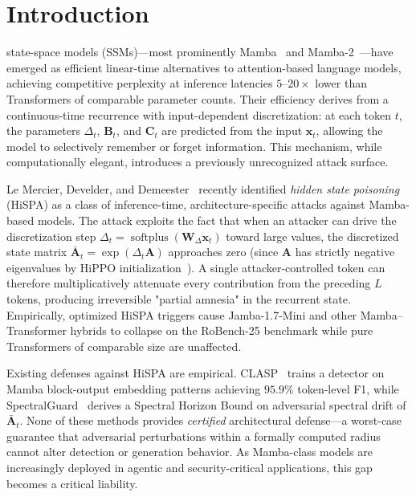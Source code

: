 \documentclass[journal,a4paper,10pt]{IEEEtran}
\theoremstyle{definition}
\theoremstyle{remark}
\DeclareMathOperator{\softplus}{softplus}
\begin{document}
\section{Introduction}
\label{sec:introduction}

 state-space models (SSMs)---most prominently Mamba~\cite{gu2024mamba} and Mamba-2~\cite{dao2024mamba2}---have emerged as efficient linear-time alternatives to attention-based language models, achieving competitive perplexity at inference latencies $5$--$20\times$ lower than Transformers of comparable parameter counts. Their efficiency derives from a continuous-time recurrence with input-dependent discretization: at each token $t$, the parameters $\Delta_t$, $\mathbf{B}_t$, and $\mathbf{C}_t$ are predicted from the input $\mathbf{x}_t$, allowing the model to selectively remember or forget information. This mechanism, while computationally elegant, introduces a previously unrecognized attack surface.

Le Mercier, Develder, and Demeester~\cite{lemercier2026hispa} recently identified \emph{hidden state poisoning} (HiSPA) as a class of inference-time, architecture-specific attacks against Mamba-based models. The attack exploits the fact that when an attacker can drive the discretization step $\Delta_t = \softplus(\mathbf{W}_\Delta \mathbf{x}_t)$ toward large values, the discretized state matrix $\bar{\mathbf{A}}_t = \exp(\Delta_t \mathbf{A})$ approaches zero (since $\mathbf{A}$ has strictly negative eigenvalues by HiPPO initialization~\cite{gu2020hippo}). A single attacker-controlled token can therefore multiplicatively attenuate every contribution from the preceding $L$ tokens, producing irreversible "partial amnesia" in the recurrent state. Empirically, optimized HiSPA triggers cause Jamba-1.7-Mini and other Mamba--Transformer hybrids to collapse on the RoBench-25 benchmark while pure Transformers of comparable size are unaffected.

Existing defenses against HiSPA are empirical. CLASP~\cite{lemercier2026clasp} trains a detector on Mamba block-output embedding patterns achieving $95.9\%$ token-level F1, while Spectral\-Guard~\cite{lemercier2026spectralguard} derives a Spectral Horizon Bound on adversarial spectral drift of $\bar{\mathbf{A}}_t$. None of these methods provides \emph{certified} architectural defense---a worst-case guarantee that adversarial perturbations within a formally computed radius cannot alter detection or generation behavior. As Mamba-class models are increasingly deployed in agentic and security-critical applications, this gap becomes a critical liability.
\end{document}
